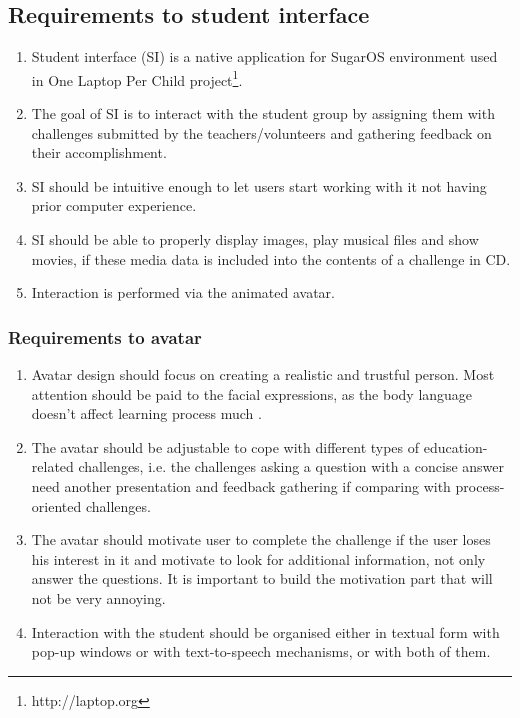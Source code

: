 \documentclass[a4paper]{article}
\begin{document}
\subsection{Requirements to student interface}

\begin{enumerate}
\item Student interface (SI) is a native application for SugarOS environment used in One Laptop Per Child project\footnote{http://laptop.org}. 

\item The goal of SI is to interact with the student group by assigning them with challenges submitted by the teachers/volunteers and gathering feedback on their accomplishment. 

\item SI should be intuitive enough to let users start working with it not having prior computer experience.

\item SI should be able to properly display images, play musical files and show movies, if these media data is included into the contents of a challenge in CD.

\item Interaction is performed via the animated avatar.
\end{enumerate}

\subsubsection{Requirements to avatar}

\begin{enumerate}
\item Avatar design should focus on creating a realistic and trustful person. Most attention should be paid to the facial expressions, as the body language doesn't affect learning process much \cite{Cowell}.

\item The avatar should be adjustable to cope with different types of education-related challenges, i.e. the challenges asking a question with a concise answer need another presentation and feedback gathering if comparing with process-oriented challenges.

\item The avatar should motivate user to complete the challenge if the user loses his interest in it and motivate to look for additional information, not only answer the questions. It is important to build the motivation part that will not be very annoying.

\item Interaction with the student should be organised either in textual form with pop-up windows or with text-to-speech mechanisms, or with both of them.
\end{enumerate}
\end{document}
